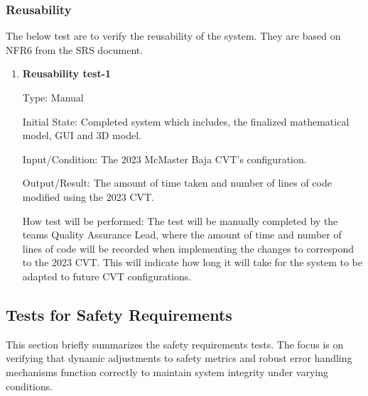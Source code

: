 \documentclass[12pt, titlepage]{article}
\begin{document}
\subsubsection{Reusability}

The below test are to verify the reusability of the system.
They are based on NFR6 from the SRS document.

\begin{enumerate}

  \item {} \hypertarget{Reusability test-1}{\textbf{Reusability test-1}} \label{Reusability test-1}
    
Type: Manual
              
Initial State: Completed system which includes, the finalized mathematical model, GUI and 3D model.  
              
Input/Condition: The 2023 McMaster Baja CVT's configuration. 
              
Output/Result: The amount of time taken and number of lines of code modified using the 2023 CVT.
              
How test will be performed: The test will be manually completed by the teams Quality Assurance Lead, where the amount of time and number of lines of code will be recorded when implementing the changes to correspond to the 2023 CVT.
This will indicate how long it will take for the system to be adapted to future CVT configurations. 
    
\end{enumerate}

\subsection{Tests for Safety Requirements}

\noindent This section briefly summarizes the safety requirements tests. The focus is on verifying that dynamic adjustments to safety metrics and robust error handling mechanisms function correctly to maintain system integrity under varying conditions.
\end{document}
